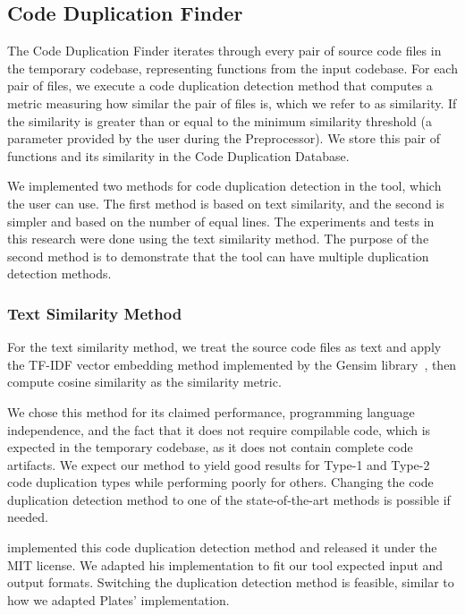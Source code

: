 \subsection{Code Duplication Finder}
\label{subsec:code_finder}

The Code Duplication Finder iterates through every pair of source code files in the temporary codebase, representing functions from the input codebase. For each pair of files, we execute a code duplication detection method that computes a metric measuring how similar the pair of files is, which we refer to as similarity. 
If the similarity is greater than or equal to the minimum similarity threshold 
(a parameter provided by the user during the Preprocessor). We store this pair of functions and its 
similarity in the Code Duplication Database.

We implemented two methods for code duplication detection in the tool, which the user can 
use. The first method is based on text similarity, and the second is simpler and 
based on the number of equal lines. The experiments and tests in this research were done 
using the text similarity method. The purpose of the second method is to demonstrate that 
the tool can have multiple duplication detection methods.

\subsubsection{Text Similarity Method}

For the text similarity method, we treat the source code files 
as text and apply the TF-IDF vector embedding method implemented by the 
Gensim library~\citep{gensim}, then compute cosine similarity as the 
similarity metric.

We chose this method for its claimed performance, 
programming language independence, and the fact that it does not require 
compilable code, which is expected in the temporary codebase, as it does 
not contain complete code artifacts. We expect our method to yield good 
results for Type-1 and Type-2 code duplication types while performing 
poorly for others. Changing the code duplication
detection method to one of the state-of-the-art methods is possible if needed.

\cite{platistool} implemented this code duplication detection method and 
released it under the MIT license. We adapted his 
implementation to fit our tool expected input and output formats. 
Switching the duplication detection method is feasible, similar to how 
we adapted Plates' implementation.

